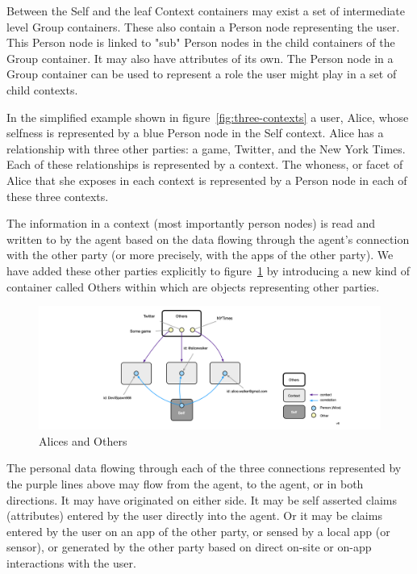 \documentclass[11pt, oneside]{article}   	%
\begin{document}
Between the Self and the leaf Context containers may exist a set of intermediate level Group containers. These also contain a Person node representing the user. This Person node is linked to "sub" Person nodes in the child containers of the Group container. It may also have attributes of its own. The Person node in a Group container can be used to represent a role the user might play in a set of child contexts. 

In the simplified example shown in figure~\ref{fig:three-contexts} a user, Alice, whose selfness is represented by a blue Person node in the Self context. Alice has a relationship with three other parties: a game, Twitter, and the New York Times. Each of these relationships is represented by a context. The whoness, or facet of Alice that she exposes in each context is represented by a Person node in each of these three contexts.

The information in a context (most importantly person nodes) is read and written to by the agent based on the data flowing through the agent's connection with the other party (or more precisely, with the apps of the other party). We have added these other parties explicitly to figure~\ref{fig:Others-container} by introducing a new kind of container called Others within which are objects representing other parties. 

\begin{figure}[h!]
\includegraphics[width=\textwidth]{./images/example2.png}
\caption{Alices and Others}
\label{fig:Others-container}
\end{figure}

The personal data flowing through each of the three connections represented by the purple lines above may flow from the agent, to the agent, or in both directions. It may have originated on either side. It may be self asserted claims (attributes) entered by the user directly into the agent. Or it may be claims entered by the user on an app of the other party, or sensed by a local app (or sensor), or generated by the other party based on direct on-site or on-app interactions with the user.
\end{document}
